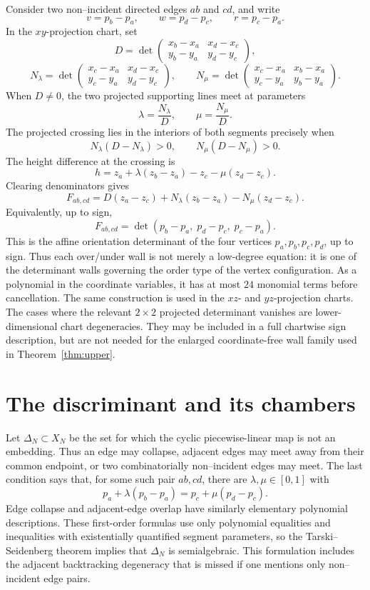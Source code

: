 \documentclass[11pt]{article}
\theoremstyle{remark}
\theoremstyle{plain}
\begin{document}
Consider two non--incident directed edges \(ab\) and \(cd\), and write
\[
    v=p_b-p_a,\qquad w=p_d-p_c,\qquad r=p_c-p_a.
\]
In the \(xy\)-projection chart, set
\[
    D=\det\begin{pmatrix}
        x_b-x_a & x_d-x_c\\
        y_b-y_a & y_d-y_c
    \end{pmatrix},
\]
\[
    N_\lambda=\det\begin{pmatrix}
        x_c-x_a & x_d-x_c\\
        y_c-y_a & y_d-y_c
    \end{pmatrix},\qquad
    N_\mu=\det\begin{pmatrix}
        x_c-x_a & x_b-x_a\\
        y_c-y_a & y_b-y_a
    \end{pmatrix}.
\]
When \(D\ne0\), the two projected supporting lines meet at parameters
\[
    \lambda=\frac{N_\lambda}{D},\qquad
    \mu=\frac{N_\mu}{D}.
\]
The projected crossing lies in the interiors of both segments precisely when
\[
    N_\lambda(D-N_\lambda)>0,\qquad
    N_\mu(D-N_\mu)>0.
\]
The height difference at the crossing is
\[
    h=z_a+\lambda(z_b-z_a)-z_c-\mu(z_d-z_c).
\]
Clearing denominators gives
\[
    F_{ab,cd}
    =
    D(z_a-z_c)
    +N_\lambda(z_b-z_a)
    -N_\mu(z_d-z_c).
\]
Equivalently, up to sign,
\[
    F_{ab,cd}
    =
    \det(p_b-p_a,\;p_d-p_c,\;p_c-p_a).
\]
This is the affine orientation determinant of the four vertices
\(p_a,p_b,p_c,p_d\), up to sign.  Thus each over/under wall is not merely a
low-degree equation: it is one of the determinant walls governing the order
type of the vertex configuration.  As a polynomial in the coordinate variables,
it has at most \(24\) monomial terms before cancellation.  The same construction
is used in the \(xz\)- and \(yz\)-projection charts.  The cases where the
relevant \(2\times2\) projected determinant vanishes are lower-dimensional
chart degeneracies.  They may be included in a full chartwise sign
description, but are not needed for the enlarged coordinate-free wall family
used in Theorem~\ref{thm:upper}.

\section{The discriminant and its chambers}

Let \(\Delta_N\subset X_N\) be the set for which the cyclic piecewise-linear
map is not an embedding.  Thus an edge may collapse, adjacent edges may meet
away from their common endpoint, or two combinatorially non--incident edges may
meet.  The last condition says that, for some such pair \(ab,cd\), there are
\(\lambda,\mu\in[0,1]\) with
\[
    p_a+\lambda(p_b-p_a)=p_c+\mu(p_d-p_c).
\]
Edge collapse and adjacent-edge overlap have similarly elementary polynomial
descriptions.  These first-order formulas use only polynomial equalities and
inequalities with existentially quantified segment parameters, so the
Tarski--Seidenberg theorem \cite[Section 2.2]{BochnakCosteRoy} implies that
\(\Delta_N\) is semialgebraic.  This formulation includes the adjacent
backtracking degeneracy that is missed if one mentions only non--incident edge
pairs.
\end{document}
